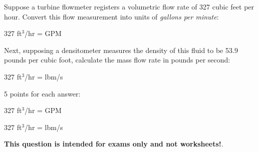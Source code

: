 

Suppose a turbine flowmeter registers a volumetric flow rate of 327 cubic feet per hour.  Convert this flow measurement into units of {\it gallons per minute}:

\vskip 10pt

327 ft$^{3}$/hr = \underbar{\hskip 50pt} GPM

\vskip 10pt

Next, supposing a densitometer measures the density of this fluid to be 53.9 pounds per cubic foot, calculate the mass flow rate in pounds per second:

\vskip 10pt

327 ft$^{3}$/hr = \underbar{\hskip 50pt} lbm/s







5 points for each answer:

\vskip 10pt

327 ft$^{3}$/hr =  GPM

327 ft$^{3}$/hr =  lbm/s







{\bf This question is intended for exams only and not worksheets!}.



